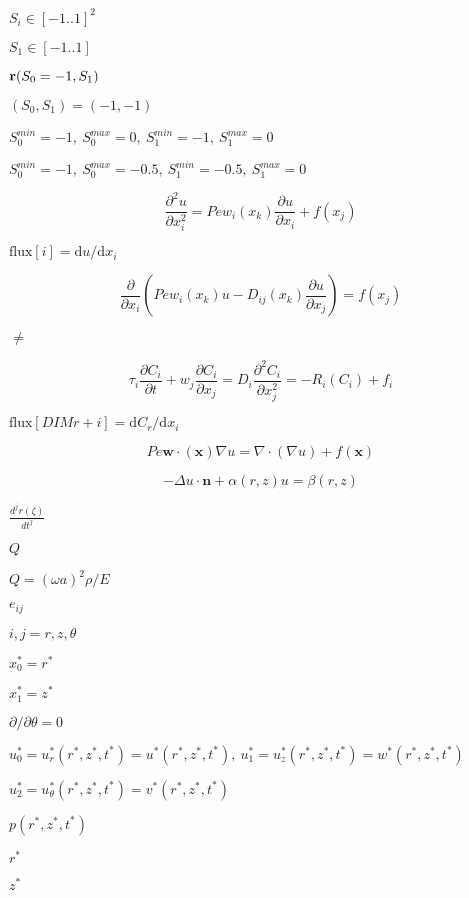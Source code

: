 \documentclass{article}
\begin{document}
$ S_i \in [-1..1]^2 $
\pagebreak

$ S_1\in [-1..1]$
\pagebreak

$ {\bf r}(S_0=-1,S_1) $
\pagebreak

$(S_0,S_1)=(-1,-1)$
\pagebreak

$ S_0^{min}=-1, \ S_0^{max}=0, \ S_1^{min}=-1, \ S_1^{max}=0 $
\pagebreak

$ S_0^{min}=-1, \ S_0^{max}=-0.5, \ S_1^{min}=-0.5, \ S_1^{max}=0 $
\pagebreak

\[ \frac{\partial^2 u}{\partial x_i^2} = Pe w_i(x_k) \frac{\partial u}{\partial x_i} + f(x_j) \]
\pagebreak

$\mbox{flux}[i] = \mbox{d}u / \mbox{d}x_i $
\pagebreak

\[ \frac{\partial}{\partial x_{i}}\left( Pe w_{i}(x_{k}) u - D_{ij}(x_{k})\frac{\partial u}{\partial x_{j}}\right) = f(x_{j}) \]
\pagebreak

$ \ne $
\pagebreak

\[ \tau_{i} \frac{\partial C_{i}}{\partial t} + w_{j} \frac{\partial C_{i}}{\partial x_{j}} = D_{i}\frac{\partial^2 C_{i}}{\partial x_j^2} = - R_{i}(C_{i}) + f_{i} \]
\pagebreak

$\mbox{flux}[DIM r + i] = \mbox{d}C_{r} / \mbox{d}x_i $
\pagebreak

\[ Pe \mathbf{w}\cdot(\mathbf{x}) \nabla u = \nabla \cdot \left( \nabla u \right) + f(\mathbf{x}) \]
\pagebreak

\[ -\Delta u \cdot \mathbf{n} + \alpha(r,z) u = \beta(r,z) \]
\pagebreak

$ \frac{d^{j} r(\zeta)}{dt^j} $
\pagebreak

$ Q $
\pagebreak

$ Q = (\omega a)^2 \rho/E $
\pagebreak

$ e_{ij} $
\pagebreak

$ i,j = r,z,\theta $
\pagebreak

$ x_0^* = r^*$
\pagebreak

$ x_1^* = z^* $
\pagebreak

$ \partial / \partial \theta = 0 $
\pagebreak

$ u_0^* = u_r^*(r^*,z^*,t^*) = u^*(r^*,z^*,t^*), \ u_1^* = u_z^*(r^*,z^*,t^*) = w^*(r^*,z^*,t^*)$
\pagebreak

$ u_2^* = u_\theta^*(r^*,z^*,t^*) = v^*(r^*,z^*,t^*) $
\pagebreak

$ p(r^*,z^*,t^*) $
\pagebreak

$ r^* $
\pagebreak

$ z^* $
\pagebreak
\end{document}
